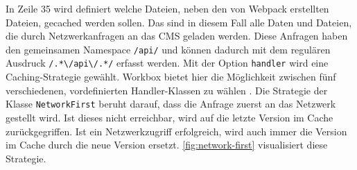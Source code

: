 In Zeile 35 wird definiert welche Dateien, neben den von Webpack erstellten Dateien, 
gecached werden sollen. Das sind in diesem Fall alle Daten und Dateien, die durch Netzwerkanfragen an 
das CMS geladen werden. Diese Anfragen haben den gemeinsamen Namespace \texttt{/api/} und 
können dadurch mit dem regulären Ausdruck \texttt{/.*\textbackslash/api\textbackslash/.*/} erfasst werden.
Mit der Option \texttt{handler} wird eine Caching-Strategie gewählt. Workbox bietet hier die Möglichkeit
zwischen fünf verschiedenen, vordefinierten Handler-Klassen zu wählen \cite{workbox-strategies}. 
Die Strategie der Klasse \texttt{NetworkFirst} beruht darauf, dass die Anfrage zuerst an das Netzwerk
gestellt wird. Ist dieses nicht erreichbar, wird auf die letzte Version im Cache zurückgegriffen. 
Ist ein Netzwerkzugriff erfolgreich, wird auch immer die Version im Cache durch die neue Version ersetzt.
\autoref{fig:network-first} visualisiert diese Strategie. 
